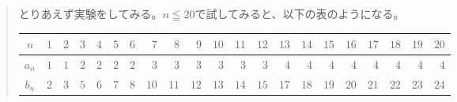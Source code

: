 \documentclass[uplatex,fleqn]{jsbook}
\begin{document}
\begin{quote}
    とりあえず実験をしてみる。$n\leqq 20$で試してみると、以下の表のようになる。

    \begin{table}[h]
        \begin{tabular}{|c||r|r|r|r|r|r|r|r|r|r|r|r|r|r|r|r|r|r|r|r|}
            \hline
            $n$ & $1$ & $2$ & $3$ & $4$ & $5$ & $6$ & $7$ & $8$ & $9$ & $10$ & $11$ & $12$ & $13$ & $14$ & $15$ & $16$ & $17$ & $18$ & $19$ & $20$\\\hline
            $a_n$ & $1$ & $1$ & $2$ & $2$ & $2$ & $2$ & $3$ & $3$ & $3$ & $3$ & $3$ & $3$ & $4$ & $4$ & $4$ & $4$ & $4$ & $4$ & $4$ & $4$\\\hline
            $b_n$ & $2$ & $3$ & $5$ & $6$ & $7$ & $8$ & $10$ & $11$ & $12$ & $13$ & $14$ & $15$ & $17$ & $18$ & $19$ & $20$ & $21$ & $22$ & $23$ & $24$\\\hline
        \end{tabular}
    \end{table}


\end{quote}
\end{document}
